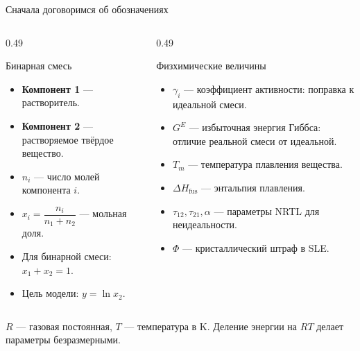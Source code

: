 \documentclass[aspectratio=169,10pt]{beamer}
\newcommand{\smallnote}[1]{{\scriptsize\color{TGSlate}#1}}
\newcommand{\tightitems}{\setlength{\itemsep}{0.25em}}
\begin{document}
\begin{frame}{Сначала договоримся об обозначениях}
  \small
  \begin{columns}[T,onlytextwidth]
    \begin{column}{0.49\textwidth}
      \begin{block}{Бинарная смесь}
        \scriptsize
        \begin{itemize}\tightitems
          \item \textbf{Компонент 1} — растворитель.
          \item \textbf{Компонент 2} — растворяемое твёрдое вещество.
          \item $n_i$ — число молей компонента $i$.
          \item $x_i=\dfrac{n_i}{n_1+n_2}$ — мольная доля.
          \item Для бинарной смеси: $x_1+x_2=1$.
          \item Цель модели: $y=\ln x_2$.
        \end{itemize}
      \end{block}
    \end{column}
    \begin{column}{0.49\textwidth}
      \begin{block}{Физхимические величины}
        \scriptsize
        \begin{itemize}\tightitems
          \item $\gamma_i$ — коэффициент активности: поправка к идеальной смеси.
          \item $G^E$ — избыточная энергия Гиббса: отличие реальной смеси от идеальной.
          \item $T_m$ — температура плавления вещества.
          \item $\Delta H_{\mathrm{fus}}$ — энтальпия плавления.
          \item $\tau_{12},\tau_{21},\alpha$ — параметры NRTL для неидеальности.
          \item $\Phi$ — кристаллический штраф в SLE.
        \end{itemize}
      \end{block}
    \end{column}
  \end{columns}
  \smallnote{$R$ — газовая постоянная, $T$ — температура в K. Деление энергии на $RT$ делает параметры безразмерными.}
\end{frame}
\end{document}
